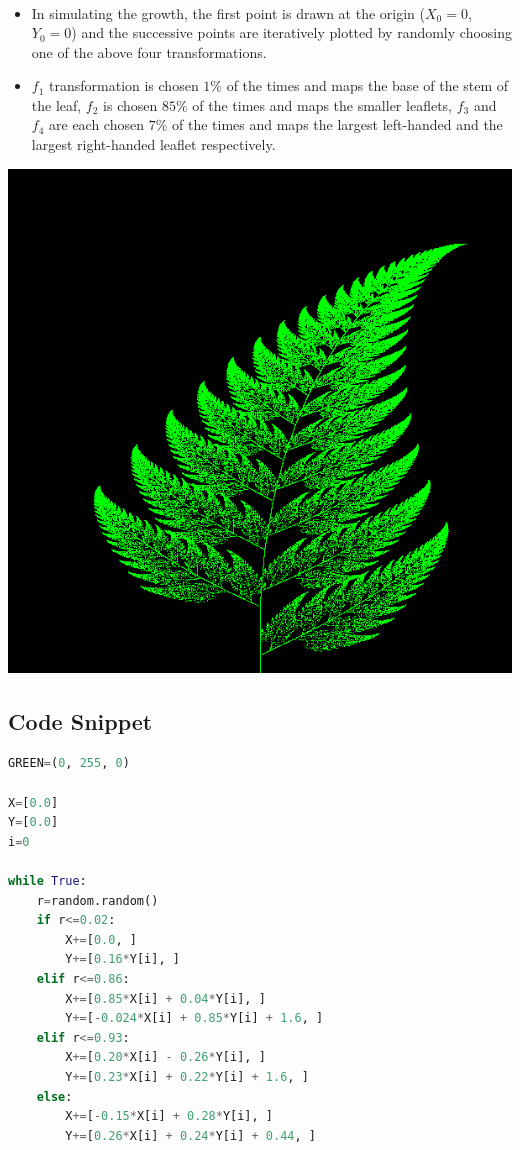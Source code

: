 \documentclass[a0,portrait]{a0poster}
\begin{document}
\begin{multicols}{3}
\begin{itemize}
\begin{gather}
\end{gather}
\item In simulating the growth, the first point is drawn at the origin ($X_0=0$, $Y_0=0$) and the successive points are iteratively plotted by randomly choosing one of the above four transformations.
\item $f_1$ transformation is chosen $1\%$ of the times and maps the base of the stem of the leaf, $f_2$ is chosen $85\%$ of the times and maps the smaller leaflets, $f_3$ and $f_4$ are each chosen $7\%$ of the times and maps the largest left-handed and the largest right-handed leaflet respectively.
\end{itemize}

\begin{center}\vspace{0.5cm}
\includegraphics[width=0.6\linewidth]{BarnsleyFern}
\end{center}\vspace{0.5cm}

\subsection*{Code Snippet}
\begin{lstlisting}[language=Python, frame=single]
GREEN=(0, 255, 0)

X=[0.0]
Y=[0.0]
i=0

while True:
    r=random.random() 
    if r<=0.02:
        X+=[0.0, ]
        Y+=[0.16*Y[i], ]
    elif r<=0.86:
        X+=[0.85*X[i] + 0.04*Y[i], ]
        Y+=[-0.024*X[i] + 0.85*Y[i] + 1.6, ]
    elif r<=0.93:
        X+=[0.20*X[i] - 0.26*Y[i], ]
        Y+=[0.23*X[i] + 0.22*Y[i] + 1.6, ]
    else:
        X+=[-0.15*X[i] + 0.28*Y[i], ]
        Y+=[0.26*X[i] + 0.24*Y[i] + 0.44, ]


\end{lstlisting}
\end{multicols}
\end{document}
